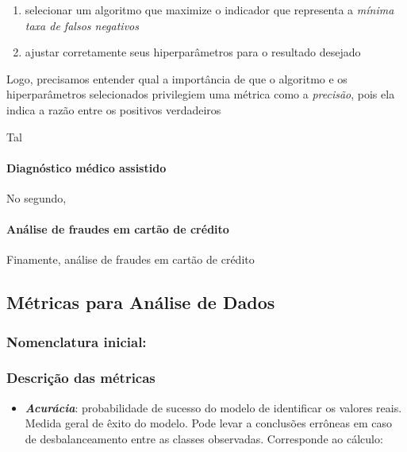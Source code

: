\documentclass[]{article}
\let\oldparagraph\paragraph
\renewcommand{\paragraph}[1]{\oldparagraph{#1}\mbox{}}
\begin{document}
\begin{enumerate}
\def\labelenumi{\arabic{enumi}.}
\item
  selecionar um algoritmo que maximize o indicador que representa a
  \emph{mínima taxa de falsos negativos}
\item
  ajustar corretamente seus hiperparâmetros para o resultado desejado
\end{enumerate}

Logo, precisamos entender qual a importância de que o algoritmo e os
hiperparâmetros selecionados privilegiem uma métrica como a
\emph{precisão}, pois ela indica a razão entre os positivos verdadeiros

Tal

\hypertarget{header-n420}{%
\paragraph{Diagnóstico médico assistido}\label{header-n420}}

No segundo,

\hypertarget{header-n423}{%
\paragraph{Análise de fraudes em cartão de crédito}\label{header-n423}}

Finamente, análise de fraudes em cartão de crédito

\hypertarget{header-n426}{%
\subsection{Métricas para Análise de Dados}\label{header-n426}}

\hypertarget{header-n427}{%
\subsubsection{Nomenclatura inicial:}\label{header-n427}}

\hypertarget{header-n429}{%
\subsubsection{Descrição das métricas}\label{header-n429}}

\begin{itemize}
\item
  \textbf{\emph{Acurácia}}: probabilidade de sucesso do modelo de
  identificar os valores reais. Medida geral de êxito do modelo. Pode
  levar a conclusões errôneas em caso de desbalanceamento entre as
  classes observadas. Corresponde ao cálculo:
\end{itemize}
\end{document}
